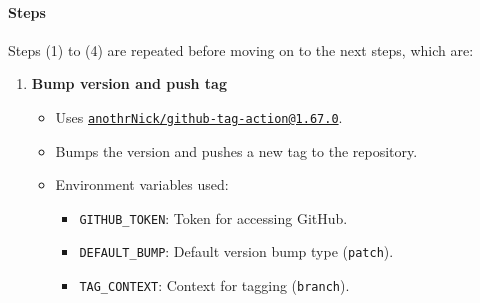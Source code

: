 \paragraph{Steps}
Steps (1) to (4) are repeated before moving on to the next steps, which are:
\begin{enumerate}
    \item \textbf{Bump version and push tag}
    \begin{itemize}
        \item Uses \href{https://github.com/marketplace/actions/github-tag-bump}{\texttt{anothrNick/github-tag-action@1.67.0}}.
        \item Bumps the version and pushes a new tag to the repository.
        \item Environment variables used:
        \begin{itemize}
            \item \texttt{GITHUB\_TOKEN}: Token for accessing GitHub.
            \item \texttt{DEFAULT\_BUMP}: Default version bump type (\texttt{patch}).
            \item \texttt{TAG\_CONTEXT}: Context for tagging (\texttt{branch}).

\end{itemize}
\end{itemize}
\end{enumerate}
